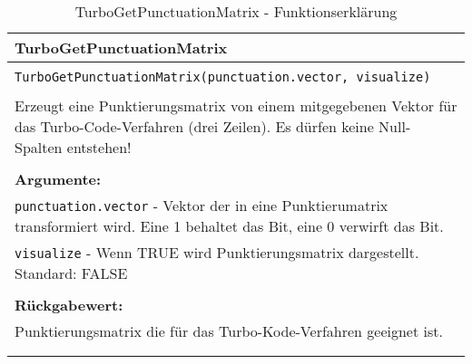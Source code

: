\begin{longtable}{|p{\textwidth}|}
\hline
\rowcolor{lightblue}TurboGetPunctuationMatrix\\
\hline
\\
\texttt{TurboGetPunctuationMatrix(punctuation.vector, visualize)}\\
\\
Erzeugt eine Punktierungsmatrix von einem mitgegebenen Vektor für das Turbo-Code-Verfahren (drei Zeilen). Es dürfen keine Null-Spalten entstehen!\\
\\
\textbf{Argumente:}\\
\texttt{punctuation.vector} - Vektor der in eine Punktierumatrix transformiert wird. Eine 1 behaltet das Bit, eine 0 verwirft das Bit.\\
\texttt{visualize} - Wenn TRUE wird Punktierungsmatrix dargestellt. Standard: FALSE\\
\\
\textbf{Rückgabewert:}\\
Punktierungsmatrix die für das Turbo-Kode-Verfahren geeignet ist.\\
\\
\hline
\caption[TurboGetPunctuationMatrix]{TurboGetPunctuationMatrix - Funktionserklärung}
\end{longtable}